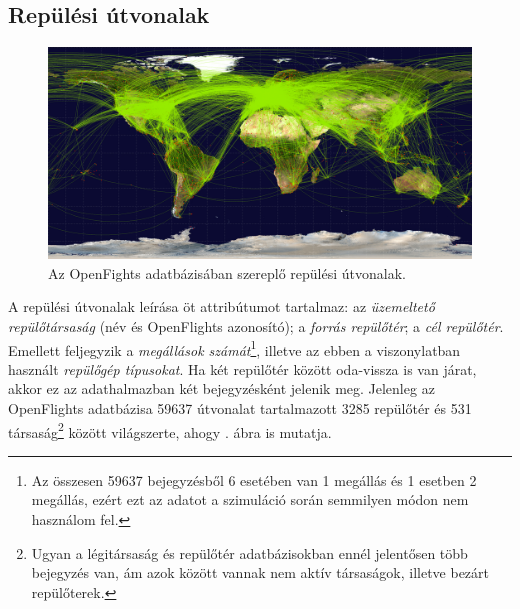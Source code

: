     \subsection{Repülési útvonalak}
    \begin{figure}[!ht]
      \centering
      \includegraphics[width=150mm,keepaspectratio=true]{./figures/routes-2048.png}
      \caption{Az OpenFights adatbázisában szereplő repülési útvonalak.}
      \label{fig:figure_repulesiutvonalak}
    \end{figure}

    A repülési útvonalak leírása öt attribútumot tartalmaz: az \textit{üzemeltető repülőtársaság} (név és OpenFlights azonosító); a \textit{forrás repülőtér}; a \textit{cél repülőtér}. Emellett feljegyzik a \textit{megállások számát}\footnote{Az összesen 59637 bejegyzésből 6 esetében van 1 megállás és 1 esetben 2 megállás, ezért ezt az adatot a szimuláció során semmilyen módon nem használom fel.}, illetve az ebben a viszonylatban használt \textit{repülőgép típusokat}. Ha két repülőtér között oda-vissza is van járat, akkor ez az adathalmazban két bejegyzésként jelenik meg. Jelenleg az OpenFlights adatbázisa 59637 útvonalat tartalmazott 3285 repülőtér és 531 társaság\footnote{Ugyan a légitársaság és repülőtér adatbázisokban ennél jelentősen több bejegyzés van, ám azok között vannak nem aktív társaságok, illetve bezárt repülőterek.} között világszerte, ahogy . ábra is mutatja.

